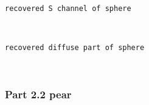\documentclass[11pt]{article}
\begin{document}
    \begin{Verbatim}[commandchars=\\\{\}]
recovered S channel of sphere

    \end{Verbatim}

    \begin{center}
    \end{center}
    { \hspace*{\fill} \\}
    
    \begin{Verbatim}[commandchars=\\\{\}]
recovered diffuse part of sphere

    \end{Verbatim}

    \begin{center}
    \end{center}
    { \hspace*{\fill} \\}
    
    \hypertarget{part-2.2-pear}{%
\subsubsection{Part 2.2 pear}\label{part-2.2-pear}}
\end{document}

